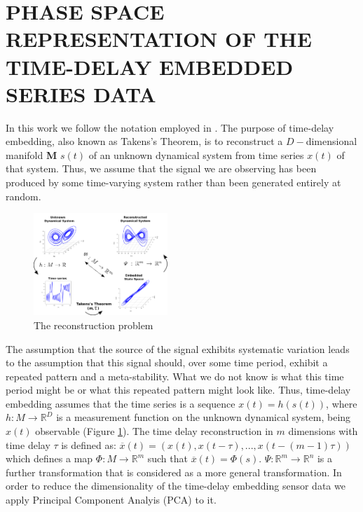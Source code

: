 \documentclass{sigchi}
\begin{document}
\section{PHASE SPACE REPRESENTATION OF THE TIME-DELAY EMBEDDED SERIES DATA}
In this work we follow the notation employed in \cite{Uzal2011}.
The purpose of time-delay embedding, also known as Takens's Theorem, 
is to reconstruct a $D-$dimensional manifold \textbf{M} $s(t)$ of an unknown dynamical 
system from time series $x(t)$ of that system.
Thus, we assume that the signal we are observing has been produced by some time-varying system 
rather than been generated entirely at random.  
\begin{figure}[!htb]
\centering    
\includegraphics[width=0.45\textwidth]{takens_theorem_v4}
\caption[PA]{The reconstruction problem}
\label{fig:takens_theorem}
\end{figure}
The assumption that the source of the signal exhibits systematic variation leads to the 
assumption that this signal should, over some time period, exhibit a repeated pattern and a meta-stability.  
What we do not know is what this time period might be or what this repeated pattern might look like.  
Thus, time-delay embedding assumes that the time series is a sequence $x(t)=h(s(t))$, 
where $h: M \rightarrow \mathbb{R}^D$ is a measurement function on the unknown dynamical system, 
being $x(t)$ observable (Figure \ref{fig:takens_theorem}).
The time delay reconstruction in $m$ dimensions with time delay $\tau$ is defined as:
$\overline{x}(t) = (x(t), x(t-\tau),...,x(t-(m-1)\tau))$ which defines a map
$\varPhi: M \rightarrow \mathbb{R}^m$ such that $\overline{x}(t) = \varPhi(s)$.
$\varPsi: \mathbb{R}^m \rightarrow \mathbb{R}^n$ is a further transformation that
is considered as a more general transformation.
In order to reduce the dimensionality of the time-delay embedding sensor data
we apply Principal Component Analyis (PCA) to it.
\end{document}
